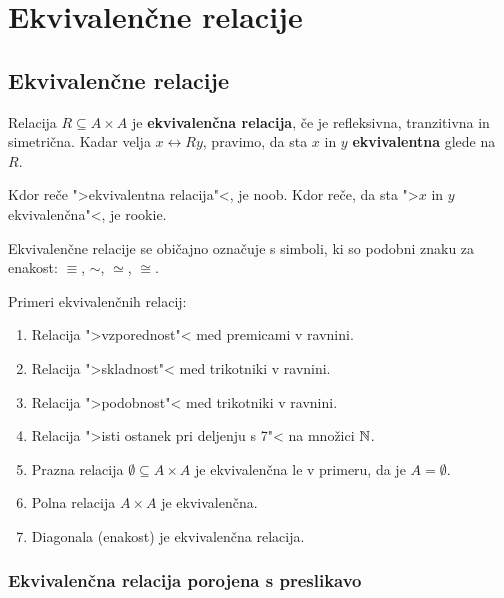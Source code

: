 \chapter{Ekvivalenčne relacije}

\section{Ekvivalenčne relacije}

\begin{definicija}
  Relacija $R \subseteq A \times A$ je \textbf{ekvivalenčna relacija}, če je refleksivna, tranzitivna in simetrična. Kadar velja $x \rel{R} y$, pravimo, da sta $x$ in $y$ \textbf{ekvivalentna} glede na~$R$.
\end{definicija}

\begin{opomba}
  Kdor reče ">ekvivalentna relacija"<, je noob. Kdor reče, da sta ">$x$ in $y$
  ekvivalenčna"<, je rookie.
\end{opomba}

Ekvivalenčne relacije se običajno označuje s simboli, ki so podobni znaku za enakost:
$\equiv$, $\sim$, $\simeq$, $\cong$.

\begin{zgled}
  Primeri ekvivalenčnih relacij:
  \begin{enumerate}
    \item Relacija ">vzporednost"< med premicami v ravnini.
    \item Relacija ">skladnost"< med trikotniki v ravnini.
    \item Relacija ">podobnost"< med trikotniki v ravnini.
    \item Relacija ">isti ostanek pri deljenju s 7"< na množici $\mathbb{N}$.
    \item Prazna relacija $\emptyset \subseteq A \times A$ je ekvivalenčna le v primeru, da je $A = \emptyset$.
    \item Polna relacija $A \times A$ je ekvivalenčna.
    \item Diagonala (enakost) je ekvivalenčna relacija.
  \end{enumerate}
\end{zgled}

\subsection{Ekvivalenčna relacija porojena s preslikavo}

